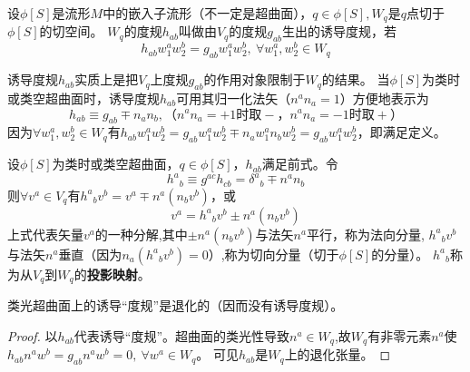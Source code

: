 \begin{definition}
	设$\phi[S]$是流形$M$中的嵌入子流形（不一定是超曲面），$q \in \phi[S], W_q$是$q$点切于$\phi[S]$的切空间。
	$W_q$的度规$h_{ab}$叫做由$V_q$的度规$g_{ab}$生出的诱导度规，若
	$$h_{ab}w_1^aw_2^b = g_{ab}w_1^aw_2^b, ~ \forall w_1^a, w_2^b \in W_q$$
\end{definition}

诱导度规$h_{ab}$实质上是把$V_q$上度规$g_{ab}$的作用对象限制于$W_q$的结果。
当$\phi[S]$为类时或类空超曲面时，诱导度规$h_{ab}$可用其归一化法矢（$n^an_a = 1$）方便地表示为
$$h_{ab} \equiv g_{ab} \mp n_an_b, \text{（$n^an_a = +1$时取$-$，$n^an_a = -1$时取$+$）}$$
因为$\forall w_1^a, w_2^b \in W_q$有$h_{ab}w_1^aw_2^b = g_{ab}w_1^aw_2^b \mp n_aw_1^an_bw_2^b = g_{ab}w_1^aw_2^b$，即满足定义。

设$\phi[S]$为类时或类空超曲面，$q \in \phi[S]$，$h_{ab}$满足前式。令
$$h^a{}_b \equiv g^{ac}h_{cb} = \delta^a{}_b \mp n^an_b$$
则$\forall v^a \in V_q$有$h^a{}_bv^b = v^a \mp n^a(n_bv^b)$，或
$$v^a = h^a{}_bv^b \pm n^a(n_bv^b)$$
上式代表矢量$v^a$的一种分解,其中$\pm n^a(n_bv^b)$与法矢$n^a$平行，称为法向分量,
$h^a{}_bv^b$与法矢$n^a$垂直（因为$n_a(h^a{}_bv^b) = 0$）,称为切向分量（切于$\phi[S]$的分量）。
$h^a{}_b$称为从$V_q$到$W_q$的\textbf{投影映射}。

\begin{theorem}
	类光超曲面上的诱导``度规''是退化的（因而没有诱导度规）。
\end{theorem}

\begin{proof}
	以$h_{ab}$代表诱导``度规''。超曲面的类光性导致$n^a \in W_q$,故$W_q$有非零元素$n^a$使$h_{ab}n^aw^b = g_{ab}n^aw^b = 0, ~ \forall w^a \in W_q$。
	可见$h_{ab}$是$W_q$上的退化张量。
\end{proof}

